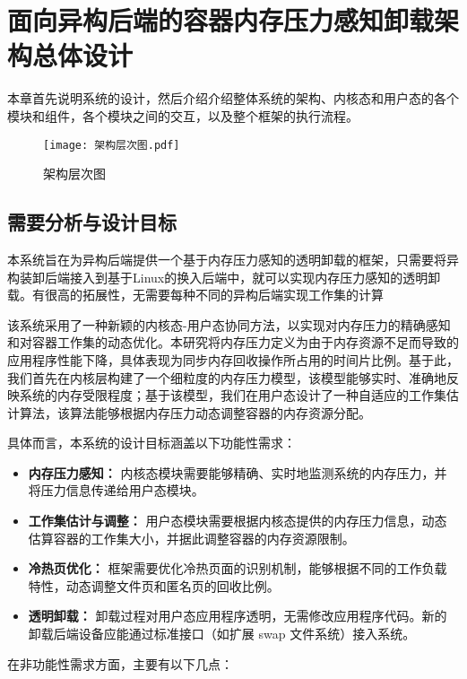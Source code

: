 \chapter{面向异构后端的容器内存压力感知卸载架构总体设计}

本章首先说明系统的设计，然后介绍介绍整体系统的架构、内核态和用户态的各个模块和组件，各个模块之间的交互，以及整个框架的执行流程。

\begin{figure}[h]
    \centering
    \texttt{[image: 架构层次图.pdf]}
    \caption{架构层次图}
    \label{fig:system_architecture_hierarchy}
\end{figure}

\section{需要分析与设计目标}

本系统旨在为异构后端提供一个基于内存压力感知的透明卸载的框架，只需要将异构装卸后端接入到基于Linux的换入后端中，就可以实现内存压力感知的透明卸载。有很高的拓展性，无需要每种不同的异构后端实现工作集的计算

该系统采用了一种新颖的内核态-用户态协同方法，以实现对内存压力的精确感知和对容器工作集的动态优化。本研究将内存压力定义为由于内存资源不足而导致的应用程序性能下降，具体表现为同步内存回收操作所占用的时间片比例。基于此，我们首先在内核层构建了一个细粒度的内存压力模型，该模型能够实时、准确地反映系统的内存受限程度；基于该模型，我们在用户态设计了一种自适应的工作集估计算法，该算法能够根据内存压力动态调整容器的内存资源分配。

具体而言，本系统的设计目标涵盖以下功能性需求：

\begin{itemize}
    \item \textbf{内存压力感知：} 内核态模块需要能够精确、实时地监测系统的内存压力，并将压力信息传递给用户态模块。
    \item \textbf{工作集估计与调整：} 用户态模块需要根据内核态提供的内存压力信息，动态估算容器的工作集大小，并据此调整容器的内存资源限制。
    \item \textbf{冷热页优化：} 框架需要优化冷热页面的识别机制，能够根据不同的工作负载特性，动态调整文件页和匿名页的回收比例。
    \item \textbf{透明卸载：} 卸载过程对用户态应用程序透明，无需修改应用程序代码。新的卸载后端设备应能通过标准接口（如扩展 swap 文件系统）接入系统。
\end{itemize}

在非功能性需求方面，主要有以下几点：

